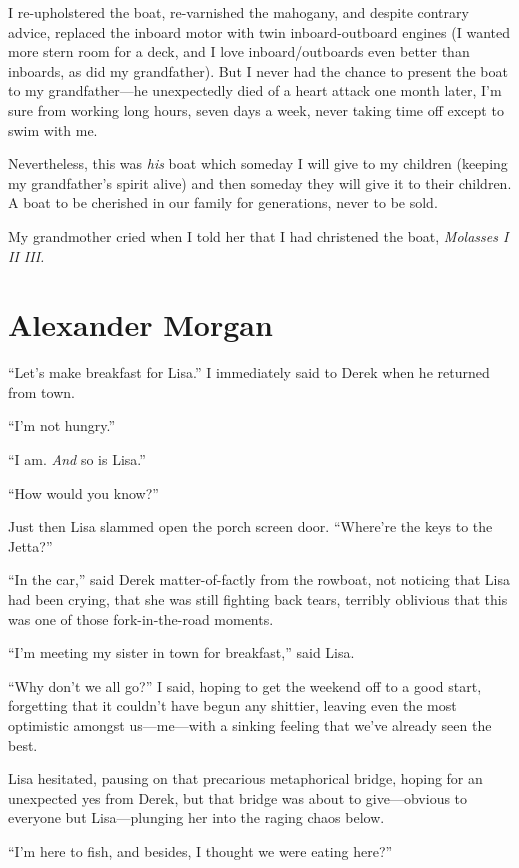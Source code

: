I re-upholstered the boat, re-varnished the mahogany, and despite
contrary advice, replaced the inboard motor with twin inboard-outboard
engines (I wanted more stern room for a deck, and I love
inboard/outboards even better than inboards, as did my grandfather). But
I never had the chance to present the boat to my grandfather---he
unexpectedly died of a heart attack one month later, I'm sure from
working long hours, seven days a week, never taking time off except to
swim with me.

Nevertheless, this was \emph{his} boat which someday I will give to my
children (keeping my grandfather's spirit alive) and then someday they
will give it to their children. A boat to be cherished in our family for
generations, never to be sold.

My grandmother cried when I told her that I had christened the boat,
\emph{Molasses I II III.}

\chapter{Alexander Morgan}

\titlemark

``Let's make breakfast for Lisa.'' I immediately said to Derek when he
returned from town.

``I'm not hungry.''

``I am. \emph{And} so is Lisa.''

``How would you know?''

Just then Lisa slammed open the porch screen door. ``Where're the keys
to the Jetta?''

``In the car,'' said Derek matter-of-factly from the rowboat, not
noticing that Lisa had been crying, that she was still fighting back
tears, terribly oblivious that this was one of those fork-in-the-road
moments.

``I'm meeting my sister in town for breakfast,'' said Lisa.

``Why don't we all go?'' I said, hoping to get the weekend off to a good
start, forgetting that it couldn't have begun any shittier, leaving even
the most optimistic amongst us---me---with a sinking feeling that we've
already seen the best.

Lisa hesitated, pausing on that precarious metaphorical bridge, hoping
for an unexpected yes from Derek, but that bridge was about to
give---obvious to everyone but Lisa---plunging her into the raging chaos
below.

``I'm here to fish, and besides, I thought we were eating here?''


